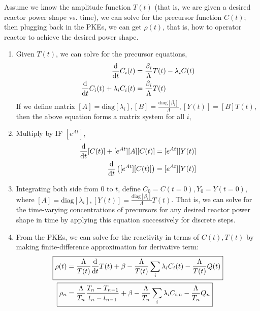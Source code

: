 \documentclass{school-22.211-notes}
\begin{document}
\clearpage
{} \label{derivation-of-IK}
Assume we know the amplitude function $T(t)$ (that is, we are given a desired reactor power shape vs. time), we can solve for the precursor function $C(t)$; then plugging back in the PKEs, we can get $\rho(t)$, that is, how to operator reactor to achieve the desired power shape. 
\begin{enumerate}
\item Given $T(t)$, we can solve for the precursor equations, 
\begin{align}
\frac{\mathrm{d}}{\mathrm{d}t} C_i(t) &= \frac{\beta_i}{\Lambda} T(t) - \lambda_i C(t) \\
\frac{\mathrm{d}}{\mathrm{d}t} C_i (t) + \lambda_i C_i(t) &= \frac{\beta_i}{\Lambda} T(t) 
\end{align}
If we define matrix $[A] = \mathrm{diag}[\lambda_i], [B] = \frac{\mathrm{diag}[\beta_i]}{\Lambda}, [Y(t)] = [B] T(t)$, then the above equation forms a matrix system for all $i$,

\item Multiply by IF $[e^{At}]$, 
\begin{align}
[e^{At}] \ddt[C(t)]  + [e^{At}][A] [C(t)] &= [e^{At}] [Y(t)] \\
\ddt \left( [e^{At}][C(t)]  \right) &=  [e^{At}] [Y(t)]
\end{align}

\item Integrating both side from $0$ to $t$, define $C_0 = C(t=0), Y_0 = Y(t=0)$,  
where $[A] = \mathrm{diag}[\lambda_i], [Y(t)] = \frac{\mathrm{diag}[\beta_i]}{\Lambda} T(t)$.
That is, we can solve for the time-varying concentrations of precursors for any desired reactor power shape in time by applying this equation successively for discrete steps. 

\item From the PKEs, we can solve for the reactivity in terms of $C(t), T(t)$ by making finite-difference approximation for derivative term: 
\begin{align}
\Aboxed{\rho(t) &= \frac{\Lambda}{T(t)} \ddt T(t) + \beta - \frac{\Lambda}{T(t)} \Sum_i \lambda_i C_i(t) - \frac{\Lambda}{T(t)} Q(t) } \\
\Aboxed{ \rho_n &= \frac{\Lambda}{T_n} \frac{T_n - T_{n-1}}{t_n - t_{n-1}} + \beta - \frac{\Lambda}{T_n} \Sum_i \lambda_i C_{i,n} - \frac{\Lambda}{T_n} Q_n } 
\end{align}
\end{enumerate}
\end{document}
